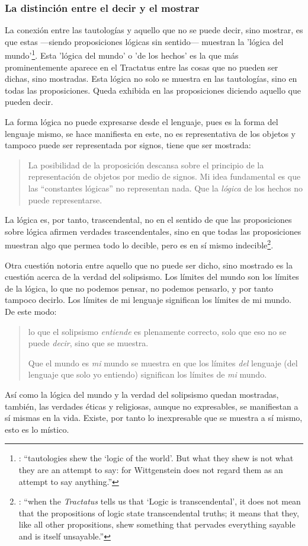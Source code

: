 \subsubsection{La distinción entre el decir y el mostrar}

La conexión entre las tautologías y aquello que no se puede decir, sino mostrar, es que estas ---siendo proposiciones lógicas sin sentido--- muestran la 'lógica del mundo'\footnote{\cite[Cf.~][163]{anscombe1959iwt}: \enquote{tautologies shew the `logic of the world'. But what they shew is not what they are an attempt to say: for Wittgenstein does not regard them as an attempt to say anything.}}. Esta 'lógica del mundo' o 'de los hechos' es la que más prominentemente aparece en el Tractatus entre las cosas que no pueden ser dichas, sino mostradas. Esta lógica no solo se muestra en las tautologías, sino en todas las proposiciones. Queda exhibida en las proposiciones diciendo aquello que pueden decir.

La forma lógica no puede expresarse desde el lenguaje, pues es la forma del lenguaje mismo, se hace manifiesta en este, no es representativa de los objetos y tampoco puede ser representada por signos, tiene que ser mostrada: \blockquote[{\cite[\S4.0312]{wittgenstein1922tractatuses}}]{La posibilidad de la proposición descansa sobre el principio de la representación de objetos por medio de signos. Mi idea fundamental es que las \enquote{constantes lógicas} no representan nada. Que la \emph{lógica} de los hechos no puede representarse.}

La lógica es, por tanto, trascendental, no en el sentido de que las proposiciones sobre lógica afirmen verdades trascendentales, sino en que todas las proposiciones muestran algo que permea todo lo decible, pero es en sí mismo indecible\footnote{\cite[Cf.~][166 \S2]{anscombe1959iwt}: \enquote{when the \emph{Tractatus} tells us that `Logic is transcendental', it does not mean that the propositions of logic state transcendental truths; it means that they, like all other propositions, shew something that pervades everything sayable and is itself unsayable.}}.

Otra cuestión notoria entre aquello que no puede ser dicho, sino mostrado es la cuestión acerca de la verdad del solipsismo. Los límites del mundo son los límites de la lógica, lo que no podemos pensar, no podemos pensarlo, y por tanto tampoco decirlo. Los límites de mi lenguaje significan los límites de mi mundo.\autocite[Cf~.][\S5.6 y \S5.61]{wittgenstein1922tractatuses} De este modo: \blockquote[{\cite[\S5.62]{wittgenstein1922tractatuses}}]{lo que el solipsismo \emph{entiende} es plenamente correcto, solo que eso no se puede \emph{decir}, sino que se muestra.

Que el mundo es \emph{mi} mundo se muestra en que los límites \emph{del} lenguaje (del lenguaje que solo yo entiendo) significan los límites de \emph{mi} mundo.} Así como la lógica del mundo y la verdad del solipsismo quedan mostradas, también, las verdades éticas y religiosas, aunque no expresables, se manifiestan a sí mismas en la vida. Existe, por tanto lo inexpresable que se muestra a sí mismo, esto es lo místico.\autocite[Cf.~][\S6.522]{wittgenstein1922tractatuses}

